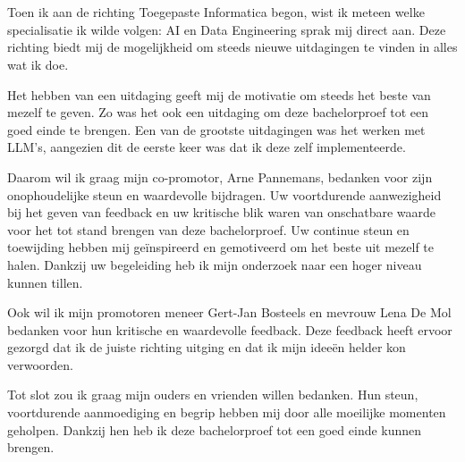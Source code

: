 
\chapter*{}%
\label{ch:voorwoord}


Toen ik aan de richting Toegepaste Informatica begon, wist ik meteen welke specialisatie ik wilde volgen: AI en Data Engineering sprak mij direct aan. 
Deze richting biedt mij de mogelijkheid om steeds nieuwe uitdagingen te vinden in alles wat ik doe.

Het hebben van een uitdaging geeft mij de motivatie om steeds het beste van mezelf te geven. 
Zo was het ook een uitdaging om deze bachelorproef tot een goed einde te brengen. 
Een van de grootste uitdagingen was het werken met LLM's, aangezien dit de eerste keer was dat ik deze zelf implementeerde.

Daarom wil ik graag mijn co-promotor, Arne Pannemans, bedanken voor zijn onophoudelijke steun en waardevolle bijdragen. 
Uw voortdurende aanwezigheid bij het geven van feedback en uw kritische blik waren van onschatbare waarde voor het tot stand brengen van deze bachelorproef. 
Uw continue steun en toewijding hebben mij geïnspireerd en gemotiveerd om het beste uit mezelf te halen. 
Dankzij uw begeleiding heb ik mijn onderzoek naar een hoger niveau kunnen tillen.

Ook wil ik mijn promotoren meneer Gert-Jan Bosteels en mevrouw Lena De Mol bedanken voor hun kritische en waardevolle feedback. 
Deze feedback heeft ervoor gezorgd dat ik de juiste richting uitging en dat ik mijn ideeën helder kon verwoorden.

Tot slot zou ik graag mijn ouders en vrienden willen bedanken. Hun steun, voortdurende aanmoediging en begrip hebben mij door alle moeilijke momenten geholpen. 
Dankzij hen heb ik deze bachelorproef tot een goed einde kunnen brengen.
